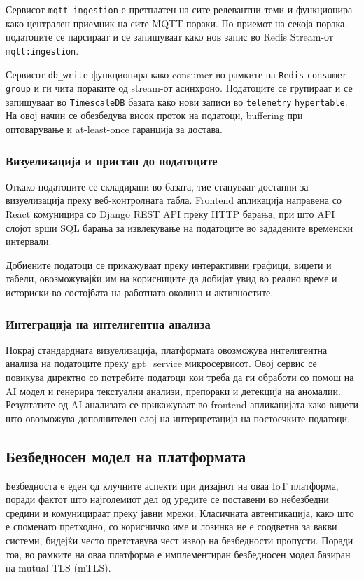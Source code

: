 Сервисот \texttt{mqtt\_ingestion} е претплатен на сите релевантни теми и
функционира како централен приемник на сите MQTT пораки. По приемот на
секоја порака, податоците се парсираат и се запишуваат како нов запис во
Redis Stream-от \texttt{mqtt:ingestion}.

Сервисот \texttt{db\_write} функционира како consumer во рамките на \texttt{Redis}
\texttt{consumer group} и ги чита пораките од stream-от асинхроно. Податоците се
групираат и се запишуваат во \texttt{TimescaleDB} базата како нови записи во
\texttt{telemetry} \texttt{hypertable}. На овој начин се обезбедува висок проток на
податоци, buffering при оптоварување и at-least-once гаранција за
достава.

\subsubsection{Визуелизација и пристап до податоците}

Откако податоците се складирани во базата, тие стануваат достапни за
визуелизација преку веб-контролната табла. Frontend апликација направена
со React комуницира со Django REST API преку HTTP барања, при што API
слојот врши SQL барања за извлекување на податоците во зададените
временски интервали.

Добиените податоци се прикажуваат преку интерактивни графици, виџети и
табели, овозможувајќи им на корисниците да добијат увид во реално време
и историски во состојбата на работната околина и активностите.

\subsubsection{Интеграција на интелигентна анализа}

Покрај стандардната визуелизација, платформата овозможува интелигентна
анализа на податоците преку gpt\_service микросервисот. Овој сервис се
повикува директно со потребите податоци кои треба да ги обработи со
помош на AI модел и генерира текстуални анализи, препораки и детекција
на аномалии. Резултатите од AI анализата се прикажуваат во frontend
апликацијата како виџети што овозможува дополнителен слој на
интерпретација на постоечките податоци.

\subsection{Безбедносен модел на платформата}

Безбедноста е еден од клучните аспекти при дизајнот на оваа IoT
платформа, поради фактот што најголемиот дел од уредите се поставени во
небезбедни средини и комуницираат преку јавни мрежи. Класичната
автентикација, како што е споменато претходно, со корисничко име и
лозинка не е соодветна за вакви системи, бидејќи често претставува чест
извор на безбедности пропусти. Поради тоа, во рамките на оваа платформа
е имплементиран безбедносен модел базиран на mutual TLS (mTLS).

